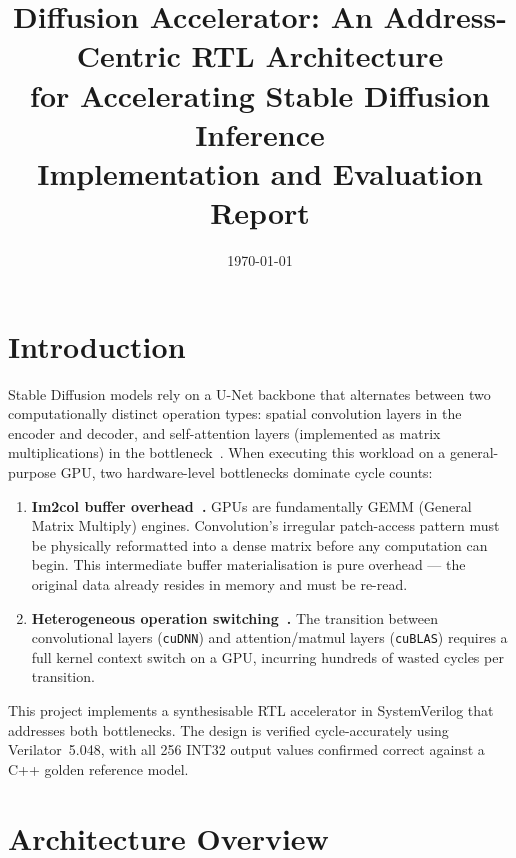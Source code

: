 \documentclass[11pt, letterpaper]{article}
\title{\textbf{Diffusion Accelerator: An Address-Centric RTL Architecture\\
for Accelerating Stable Diffusion Inference}\\[0.4em]
\large Implementation and Evaluation Report}
\author{}
\date{\today}
\begin{document}
\maketitle
\tableofcontents
\newpage

\section{Introduction}

Stable Diffusion models rely on a U-Net backbone that alternates between two
computationally distinct operation types: spatial convolution layers in the
encoder and decoder, and self-attention layers (implemented as matrix
multiplications) in the bottleneck~\cite{sdacc2025}. When executing this
workload on a general-purpose GPU, two hardware-level bottlenecks dominate
cycle counts:

\begin{enumerate}
  \item \textbf{Im2col buffer overhead~\cite{sdacc2025}.} GPUs are
        fundamentally GEMM (General Matrix Multiply) engines. Convolution's
        irregular patch-access pattern must be physically reformatted into a
        dense matrix before any computation can begin. This intermediate
        buffer materialisation is pure overhead — the original data already
        resides in memory and must be re-read.

  \item \textbf{Heterogeneous operation switching~\cite{sdacc2025}.} The
        transition between convolutional layers (\texttt{cuDNN}) and
        attention/matmul layers (\texttt{cuBLAS}) requires a full kernel
        context switch on a GPU, incurring hundreds of wasted cycles per
        transition.
\end{enumerate}

This project implements a synthesisable RTL accelerator in SystemVerilog that
addresses both bottlenecks. The design is verified cycle-accurately using
Verilator~5.048, with all 256 INT32 output values confirmed correct against a
C++ golden reference model.

\section{Architecture Overview}
\end{document}
